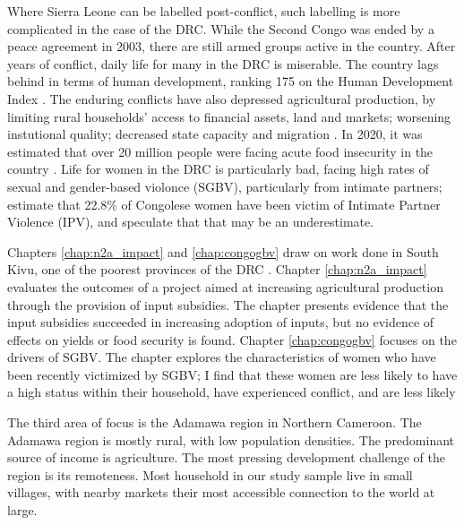 Where Sierra Leone can be labelled post-conflict, such labelling is more complicated in the case of the DRC. While the Second Congo was ended by a peace agreement in 2003, there are still armed groups active in the country. After years of conflict, daily life for many in the DRC is miserable. The country lags behind in terms of human development, ranking 175 on the Human Development Index \citep{UNDP2020a}. The enduring conflicts have also depressed agricultural production, by limiting rural households' access to financial assets, land and markets; worsening instutional quality; decreased state capacity and migration  \citep{Lecoutere2005, Vlassenroot}. In 2020, it was estimated that over 20 million people were facing acute food insecurity in the country \citep{FAO2020}. Life for women in the DRC is particularly bad, facing high rates of sexual and gender-based violonce (SGBV), particularly from intimate partners; \cite{Peterman2011} estimate that 22.8\% of Congolese women have been victim of Intimate Partner Violence (IPV), and speculate that that may be an underestimate.

Chapters \ref{chap:n2a_impact} and \ref{chap:congogbv} draw on work done in South Kivu, one of the poorest provinces of the DRC \citep{Ansoms2009}. Chapter \ref{chap:n2a_impact} evaluates the outcomes of a project aimed at increasing agricultural production through the provision of input subsidies. The chapter presents evidence that the input subsidies succeeded in increasing adoption of inputs, but no evidence of effects on yields or food security is found. Chapter \ref{chap:congogbv} focuses on the drivers of SGBV. The chapter explores the characteristics of women who have been recently victimized by SGBV; I find that these women are less likely to have a high status within their household, have experienced conflict, and are less likely   

The third area of focus is the Adamawa region in Northern Cameroon. The Adamawa region is mostly rural, with low population densities. The predominant source of income is agriculture. The most pressing development challenge of the region is its remoteness. Most household in our study sample live in small villages, with nearby markets their most accessible connection to the world at large.

